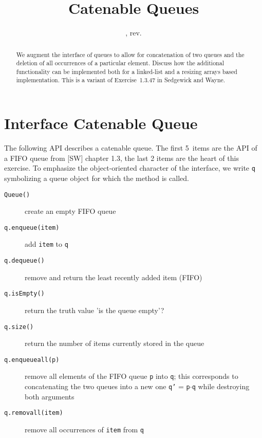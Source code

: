 \documentclass{tufte-handout}
\title{Catenable Queues}
\author{}
\date{\GITAuthorDate, rev. \GITAbrHash}
\begin{document}
\maketitle

\begin{abstract}
  We augment the interface of queues to allow for concatenation of two queues and the deletion of all occurrences of a particular element.
  Discuss how the additional functionality can be implemented both for a linked-list and a resizing arrays based implementation.
  This is a variant of Exercise~1.3.47 in Sedgewick and Wayne.
\end{abstract}

\section{Interface Catenable Queue}

The following API describes a catenable queue. The first 5~items are the API of a FIFO queue from [SW] chapter 1.3, the last 2 items are the heart of this exercise.
To emphasize the object-oriented character of the interface, we write \texttt{q} symbolizing a queue object for which the method is called.
\begin{description}
\item [\texttt{Queue()}] create an empty FIFO queue
\item[\texttt{q.enqueue(item)}] add \texttt{item} to \texttt{q}
\item[\texttt{q.dequeue()}] remove and return the least recently added item (FIFO)
\item[\texttt{q.isEmpty()}] return the truth value 'is the queue empty'?
\item[\texttt{q.size()}] return the number of items currently stored in the queue
\item[\texttt{q.enqueueall(p)}] remove all elements of the FIFO queue \texttt{p} into \texttt{q}; this corresponds to concatenating the two queues into a new one \texttt{q'} = \texttt{p$\cdot$q} while destroying both arguments
\item[\texttt{q.removall(item)}] remove all occurrences of \texttt{item} from \texttt{q}
\end{description}
\end{document}
